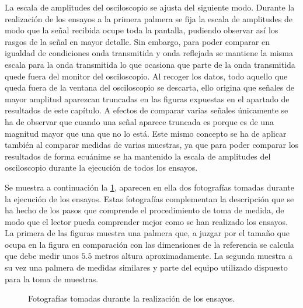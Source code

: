 La escala de amplitudes del osciloscopio se ajusta del siguiente modo.
Durante la realización de los ensayos a la primera palmera se fija la
escala de amplitudes de modo que la señal recibida ocupe toda la pantalla,
pudiendo observar así los rasgos de la señal en mayor detalle. Sin embargo,
para poder comparar en igualdad de condiciones onda transmitida y onda
reflejada se mantiene la misma escala para la onda transmitida lo que
ocasiona que parte de la onda transmitida quede fuera del monitor del
osciloscopio. Al recoger los datos, todo aquello que queda fuera de la
ventana del osciloscopio se descarta, ello origina que señales de mayor
amplitud aparezcan truncadas en las figuras expuestas en el apartado de
resultados de este capítulo. A efectos de comparar varias señales
únicamente se ha de observar que cuando una señal aparece truncada es
porque es de una magnitud mayor que una que no lo está. Este mismo concepto
se ha de aplicar también al comparar medidas de varias muestras, ya que
para poder comparar los resultados de forma ecuánime se ha mantenido la
escala de amplitudes del osciloscopio durante la ejecución de todos los
ensayos.

Se muestra a continuación la \cref{fig:tests}, aparecen en ella dos
fotografías tomadas durante la ejecución de los ensayos. Estas fotografías
complementan la descripción que se ha hecho de los pasos que comprende el
procedimiento de toma de medida, de modo que el lector pueda comprender
mejor como se han realizado los ensayos. La primera de las figuras muestra
una palmera que, a juzgar por el tamaño que ocupa en la figura en
comparación con las dimensiones de la referencia se calcula que debe medir
unos $5.5$ metros altura aproximadamente. La segunda muestra a su vez una
palmera de medidas similares y parte del equipo utilizado dispuesto para la
toma de muestras.

\begin{figure}
    \begin{center}
    \end{center}
    \caption[Fotografías tomadas durante la realización de los
    ensayos]{Fotografías tomadas durante la realización de los ensayos.}
    \label{fig:tests}
\end{figure}


